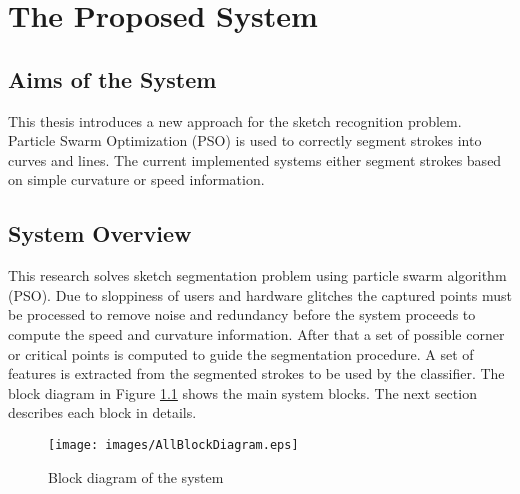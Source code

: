 \chapter{The Proposed System}
\label{sec:proposedSystem}
\section{Aims of the System}
\label{sec:AimsOfTheSystem}
This thesis introduces a new approach for the sketch recognition problem. Particle Swarm Optimization (PSO) is used to correctly segment strokes into curves and lines. The current implemented systems either segment strokes based on simple curvature\cite{meanshift10,earlySketchbased4} or speed information\cite{earlySketchbased4}. %


\section{System Overview}
\label{sec:AnOverviewOfTheSystem}
   This research solves sketch segmentation problem using particle swarm algorithm (PSO).  Due to sloppiness of users and hardware glitches the captured points must be processed to remove noise and redundancy before the system proceeds to compute the speed and curvature information. After that a set of possible corner or critical points is computed to guide the segmentation procedure.  A set of features is extracted from the segmented strokes to be used by the classifier.  %
The block diagram in Figure \ref{fig:Blockdiagram} shows the main system blocks. The next section describes each block in details.
\begin{figure}[]
	\centering
	
\begin{center}
	\texttt{[image: images/AllBlockDiagram.eps]}
	\caption[The System Block Diagram]{Block diagram of the system}
	\label{fig:Blockdiagram}
\end{center}
\end{figure}
 

